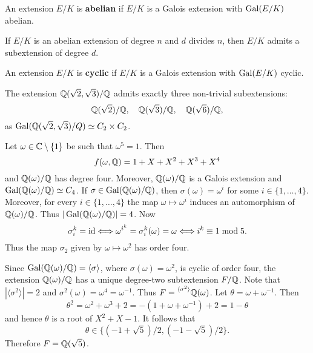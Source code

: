 \begin{definition}
    An extension $E/K$ is \textbf{abelian} if $E/K$ is a Galois extension
    with $\operatorname{Gal}(E/K)$ abelian.
\end{definition}

\begin{exercise}
    If $E/K$ is an abelian extension of degree $n$ and $d$ divides
    $n$, then $E/K$ admits a subextension of degree $d$. 
\end{exercise}

\begin{definition}
    An extension $E/K$ is \textbf{cyclic} if $E/K$ is 
    a Galois extension with $\operatorname{Gal}(E/K)$ cyclic. 
\end{definition}

\begin{example}
    The extension $\mathbb{Q}(\sqrt{2},\sqrt{3})/\mathbb{Q}$ admits
    exactly three non-trivial subextensions: 
    \[
    \mathbb{Q}(\sqrt{2})/\mathbb{Q},
    \quad
    \mathbb{Q}(\sqrt{3})/\mathbb{Q},
    \quad 
    \mathbb{Q}(\sqrt{6})/\mathbb{Q},
    \]
    as $\operatorname{Gal}(\mathbb{Q}(\sqrt{2},\sqrt{3})/Q)\simeq C_2\times C_2$. 
\end{example}

\begin{example}
    Let $\omega\in\mathbb{C}\setminus\{1\}$ be such that $\omega^5=1$.
    Then 
    \[
    f(\omega,\mathbb{Q})=1+X+X^2+X^3+X^4
    \]
    and $\mathbb{Q}(\omega)/\mathbb{Q}$ has
    degree four. 
    Moreover, $\mathbb{Q}(\omega)/\mathbb{Q}$ is a Galois extension
    and 
    $\operatorname{Gal}(\mathbb{Q}(\omega)/\mathbb{Q})\simeq C_4$. If $\sigma\in \operatorname{Gal}(\mathbb{Q}(\omega)/\mathbb{Q})$,
    then $\sigma(\omega)=\omega^i$ for some $i\in\{1,\dots,4\}$. 
    Moreover, for every $i\in\{1,\dots,4\}$ 
    the map $\omega\mapsto\omega^i$ induces an automorphism
    of $\mathbb{Q}(\omega)/\mathbb{Q}$. Thus $|\operatorname{Gal}(\mathbb{Q}(\omega)/\mathbb{Q})|=4$. Now 
    \[
    \sigma_i^k=\operatorname{id}\Longleftrightarrow
    \omega^{i^k}=\sigma_i^k(\omega)=\omega\Longleftrightarrow
    i^k\equiv1\bmod 5.
    \]
    Thus the map $\sigma_2$ given 
    by $\omega\mapsto\omega^2$ has order four. 
    
    Since $\operatorname{Gal}(\mathbb{Q}(\omega)/\mathbb{Q})=\langle\sigma\rangle$,
    where $\sigma(\omega)=\omega^2$, 
    is cyclic of order four, 
    the extension $\mathbb{Q}(\omega)/\mathbb{Q}$ has a unique degree-two 
    subtextension $F/\mathbb{Q}$. Note that $|\langle\sigma^2\rangle|=2$ 
    and $\sigma^2(\omega)=\omega^4=\omega^{-1}$. Thus 
    $F=\prescript{\langle\sigma^2\rangle}{}{\mathbb{Q}(\omega)}$. Let 
    $\theta=\omega+\omega^{-1}$. Then 
    \[
    \theta^2=\omega^2+\omega^3+2=-(1+\omega+\omega^{-1})+2=1-\theta
    \]
    and hence $\theta$ is a root of $X^2+X-1$. It follows that 
    \[
    \theta\in\{(-1+\sqrt{5})/2,(-1-\sqrt{5})/2\}.
    \]
    Therefore
    $F=\mathbb{Q}(\sqrt{5})$. 
\end{example}

